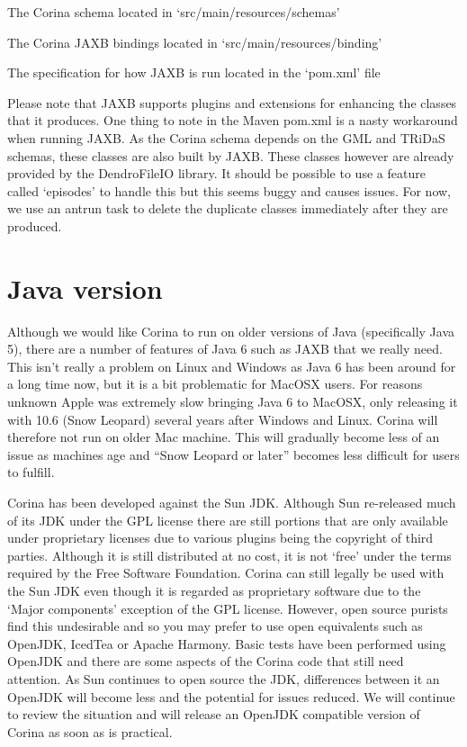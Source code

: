 \begin{itemize*}
 \item The Corina schema located in `src/main/resources/schemas'
 \item The Corina JAXB bindings located in `src/main/resources/binding'
 \item The specification for how JAXB is run located in the `pom.xml' file
\end{itemize*}

Please note that JAXB supports plugins and extensions for enhancing the classes that it produces.  One thing to note in the Maven pom.xml is a nasty workaround when running JAXB.  As the Corina schema depends on the GML and TRiDaS schemas, these classes are also built by JAXB.  These classes however are already provided by the DendroFileIO library.  It should be possible to use a feature called `episodes' to handle this but this seems buggy and causes issues.  For now, we use an antrun task to delete the duplicate classes immediately after they are produced.


\section{Java version}
\label{txt:java}
Although we would like Corina to run on older versions of Java (specifically Java 5), there are a number of features of Java 6 such as JAXB that we really need.  This isn't really a problem on Linux and Windows as Java 6 has been around for a long time now, but it is a bit problematic for MacOSX users.  For reasons unknown Apple was extremely slow bringing Java 6 to MacOSX, only releasing it with 10.6 (Snow Leopard) several years after Windows and Linux.  Corina will therefore not run on older Mac machine.  This will gradually become less of an issue as machines age and ``Snow Leopard or later'' becomes less difficult for users to fulfill.  

Corina has been developed against the Sun JDK.  Although Sun re-released much of its JDK under the GPL license there are still portions that are only available under  proprietary licenses due to various plugins being the copyright of third parties.  Although it is still distributed at no cost, it is not `free' under the terms required by the Free Software Foundation.  Corina can still legally be used with the Sun JDK even though it is regarded as proprietary software due to the `Major components' exception of the GPL license.  However, open source purists find this undesirable and so you may prefer to use open equivalents such as OpenJDK, IcedTea or Apache Harmony.   Basic tests have been performed using OpenJDK and there are some aspects of the Corina code that still need attention.  As Sun continues to open source the JDK, differences between it an OpenJDK will become less and the potential for issues reduced.  We will continue to review the situation and will release an OpenJDK compatible version of Corina as soon as is practical.


